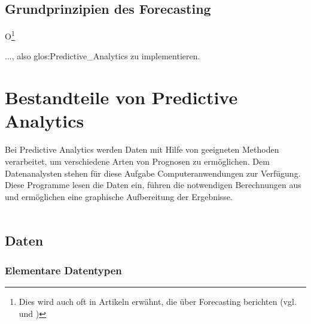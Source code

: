 \subsection{Grundprinzipien des Forecasting}


O\footnote{
Dies wird auch oft in Artikeln erwähnt, die über Forecasting berichten (vgl.
\cite{Economist} und \cite{Burton})
}

..., also \gls{glos:Predictive_Analytics} zu implementieren.

\section{Bestandteile von Predictive Analytics}

Bei Predictive Analytics werden Daten mit Hilfe von geeigneten Methoden
verarbeitet, um verschiedene Arten von Prognosen zu ermöglichen. Dem
Datenanalysten stehen für diese Aufgabe Computeranwendungen zur Verfügung.
Diese Programme lesen die Daten ein, führen die notwendigen Berechnungen aus und
ermöglichen eine graphische Aufbereitung der Ergebnisse. \\ \\

\subsection{Daten}


\subsubsection{Elementare Datentypen}


